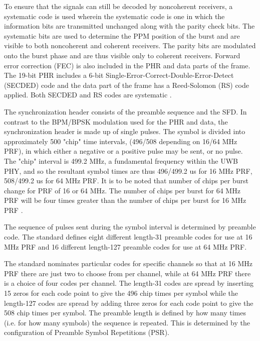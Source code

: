 To ensure that the signals can still be decoded by noncoherent receivers, a systematic code is used wherein the systematic code is one in which the information bits are transmitted unchanged along with the parity check bits. The systematic bits are used to determine the PPM position of the burst and are visible to both noncoherent and coherent receivers. The parity bits are modulated onto the burst phase and are thus visible only to coherent receivers. Forward error correction (FEC) is also included in the PHR and data parts of the frame. The 19-bit PHR includes a 6-bit Single-Error-Correct-Double-Error-Detect (SECDED) code and the data part of the frame has a Reed-Solomon (RS) code applied. Both SECDED and RS codes are systematic \cite{zhang2009uwb}.

The synchronization header consists of the preamble sequence and the SFD. In contrast to the BPM/BPSK modulation used for the PHR and data, the synchronization header is made up of single pulses. The symbol is divided into approximately 500 "chip" time intervals, (496/508 depending on 16/64 MHz PRF), in which either a negative or a positive pulse may be sent, or no pulse. The "chip" interval is 499.2 MHz, a fundamental frequency within the UWB PHY, and so the resultant symbol times are thus 496/499.2 us for 16 MHz PRF, 508/499.2 us for 64 MHz PRF. It is to be noted that number of chips per burst change for PRF of 16 or 64 MHz. The number of chips per burst for 64 MHz PRF will be four times greater than the number of chips per burst for 16 MHz PRF  \cite{gutierrez2004low}.

The sequence of pulses sent during the symbol interval is determined by preamble code. The standard defines eight different length-31 preamble codes for use at 16 MHz PRF and 16 different length-127 preamble codes for use at 64 MHz PRF. 

The standard nominates particular codes for specific channels so that at 16 MHz PRF there are just two to choose from per channel, while at 64 MHz PRF there is a choice of four codes per channel. The length-31 codes are spread by inserting 15 zeros for each code point to give the 496 chip times per symbol while the length-127 codes are spread by adding three zeros for each code point to give the 508 chip times per symbol. The preamble length is defined by how many times (i.e. for how many symbols) the sequence is repeated. This is determined by the configuration of Preamble Symbol Repetitions (PSR).

